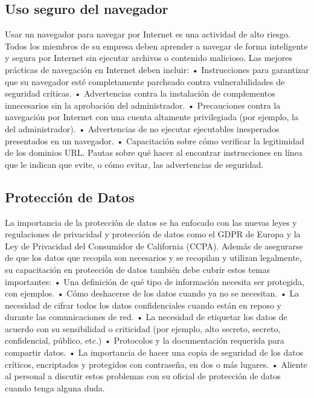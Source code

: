 \documentclass[
]{article}
\begin{document}
\hypertarget{uso-seguro-del-navegador}{%
\subsection{Uso seguro del navegador}\label{uso-seguro-del-navegador}}

Usar un navegador para navegar por Internet es una actividad de alto riesgo. Todos los miembros de su empresa deben aprender a navegar de forma inteligente y segura por Internet sin ejecutar archivos o contenido malicioso.
Las mejores prácticas de navegación en Internet deben incluir:
• Instrucciones para garantizar que su navegador esté completamente parcheado contra vulnerabilidades de seguridad críticas.
• Advertencias contra la instalación de complementos innecesarios sin la aprobación del administrador.
• Precauciones contra la navegación por Internet con una cuenta altamente privilegiada (por ejemplo, la del administrador).
• Advertencias de no ejecutar ejecutables inesperados presentados en un navegador.
• Capacitación sobre cómo verificar la legitimidad de los dominios URL.
Pautas sobre qué hacer al encontrar instrucciones en línea que le indican que evite, o cómo evitar, las advertencias de seguridad.

\hypertarget{protecciuxf3n-de-datos}{%
\subsection{Protección de Datos}\label{protecciuxf3n-de-datos}}

La importancia de la protección de datos se ha enfocado con las nuevas leyes y regulaciones de privacidad y protección de datos como el GDPR de Europa y la Ley de Privacidad del Consumidor de California (CCPA). Además de asegurarse de que los datos que recopila son necesarios y se recopilan y utilizan legalmente, su capacitación en protección de datos también debe cubrir estos temas importantes:
• Una definición de qué tipo de información necesita ser protegida, con ejemplos.
• Cómo deshacerse de los datos cuando ya no se necesitan.
• La necesidad de cifrar todos los datos confidenciales cuando están en reposo y durante las comunicaciones de red.
• La necesidad de etiquetar los datos de acuerdo con su sensibilidad o criticidad (por ejemplo, alto secreto, secreto, confidencial, público, etc.)
• Protocolos y la documentación requerida para compartir datos.
• La importancia de hacer una copia de seguridad de los datos críticos, encriptados y protegidos con contraseña, en dos o más lugares.
• Aliente al personal a discutir estos problemas con su oficial de protección de datos cuando tenga alguna duda.
\end{document}
